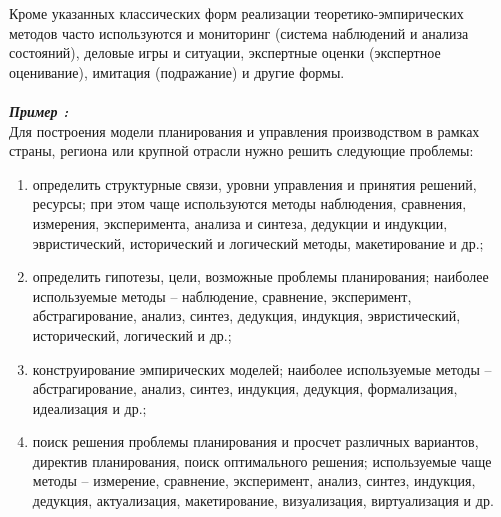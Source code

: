 Кроме указанных классических форм реализации теоретико-эмпирических методов часто используются и мониторинг (система наблюдений и анализа состояний), деловые игры и ситуации, экспертные оценки (экспертное оценивание), имитация (подражание) и другие формы.\\
\\\emph{\textbf{Пример :}}
\\Для построения модели планирования и управления производством в рамках страны, региона или крупной отрасли нужно решить следующие проблемы:
\begin{enumerate}
\item определить структурные связи, уровни управления и принятия решений, ресурсы; при этом чаще используются методы наблюдения, сравнения, измерения, эксперимента, анализа и синтеза, дедукции и индукции, эвристический, исторический и логический методы, макетирование и др.;
\item определить гипотезы, цели, возможные проблемы планирования; наиболее используемые методы – наблюдение, сравнение, эксперимент, абстрагирование, анализ, синтез, дедукция, индукция, эвристический, исторический, логический и др.;
\item конструирование эмпирических моделей; наиболее используемые методы – абстрагирование, анализ, синтез, индукция, дедукция, формализация, идеализация и др.;
\item поиск решения проблемы планирования и просчет различных вариантов, директив планирования, поиск оптимального решения; используемые чаще методы – измерение, сравнение, эксперимент, анализ, синтез, индукция, дедукция, актуализация, макетирование, визуализация, виртуализация и др.
\end{enumerate}